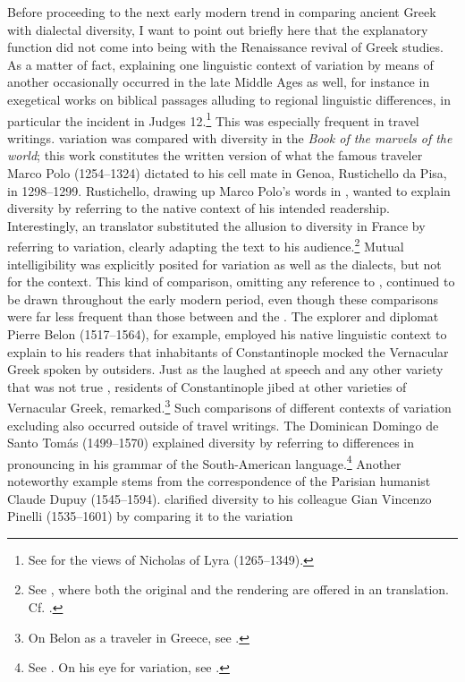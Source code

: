 Before proceeding to the next early modern trend in comparing ancient Greek with  dialectal diversity, I want to point out briefly here that the explanatory function did not come into being with the Renaissance revival of Greek studies. As a matter of fact, explaining one linguistic context of variation by means of another occasionally occurred in the late Middle Ages as well, for instance in exegetical works on biblical passages alluding to regional linguistic differences, in particular the  incident in Judges 12.\footnote{See \citet[199--200]{VanRooy2018b} for the views of Nicholas of Lyra (1265–1349).} This was especially frequent in travel writings.  variation was compared with  diversity in the \textit{Book of the marvels of the world}; this work constitutes the written version of what the famous  traveler Marco Polo (1254–1324) dictated to his cell mate in Genoa, Rustichello da Pisa, in 1298–1299. Rustichello, drawing up Marco Polo’s words in , wanted to explain  diversity by referring to the native context of his intended readership. Interestingly, an  translator substituted the allusion to diversity in France by referring to  variation, clearly adapting the text to his  audience.\footnote{See \citet[157]{Polo1938}, where both the  original and the  rendering are offered in an  translation. Cf. \citet[855]{Borst1959}.} Mutual intelligibility was explicitly posited for  variation as well as the  dialects, but not for the  context. This kind of comparison, omitting any reference to , continued to be drawn throughout the early modern period, even though these comparisons were far less frequent than those between  and the . The  explorer and diplomat Pierre Belon (1517–1564), for example, employed his native linguistic context to explain to his readers that inhabitants of Constantinople mocked the Vernacular Greek spoken by outsiders. Just as the  laughed at  speech and any other  variety that was not true , residents of Constantinople jibed at other varieties of Vernacular Greek, \citet[5\textsc{\textsuperscript{v}}]{Belon1553} remarked.\footnote{On Belon as a traveler in Greece, see \citet[esp. 122]{Vingopoulou2004}.} Such comparisons of different contexts of variation excluding  also occurred outside of travel writings. The  Dominican Domingo de Santo Tomás (1499–1570) explained  diversity by referring to  differences in pronouncing  in his grammar of the South-American language.\footnote{See \citet[1\textsc{\textsuperscript{v}}]{Santo1560}. On his eye for variation, see \citet[140]{Calvo2005}.} Another noteworthy example stems from the correspondence of the Parisian humanist Claude Dupuy (1545–1594). \citet[274]{Dupuy2001} clarified  diversity to his  colleague Gian Vincenzo Pinelli (1535–1601) by comparing it to the variation 